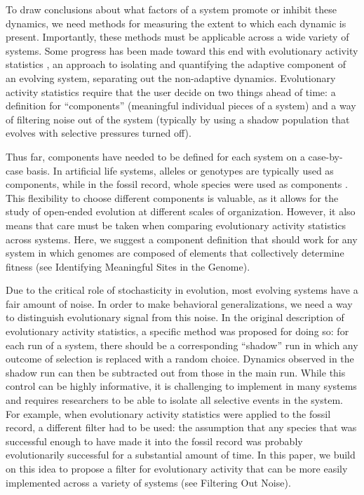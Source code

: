 \documentclass[letterpaper]{article}
\begin{document}
To draw conclusions about what factors of a system promote or inhibit these dynamics, we need methods for measuring the extent to which each dynamic is present. Importantly, these methods must be applicable across a wide variety of systems. Some progress has been made toward this end with evolutionary activity statistics \citep{bedau_classification_1998, channon_passing_2001}, an approach to isolating and quantifying the adaptive component of an evolving system, separating out the non-adaptive dynamics. Evolutionary activity statistics require that the user decide on two things ahead of time: a definition for ``components'' (meaningful individual pieces of a system) and a way of filtering noise out of the system (typically by using a shadow population that evolves with selective pressures turned off). 

Thus far, components have needed to be defined for each system on a case-by-case basis.  In artificial life systems, alleles or genotypes are typically used as components, while in the fossil record, whole species were used as components \citep{bedau1998classification}.
This flexibility to choose different components is valuable, as it allows for the study of open-ended evolution at different scales of organization. However, it also means that care must be taken when comparing evolutionary activity statistics across systems. Here, we suggest a component definition that should work for any system in which genomes are composed of elements that collectively determine fitness (see Identifying Meaningful Sites in the Genome).

Due to the critical role of stochasticity in evolution, most evolving systems have a fair amount of noise. In order to make behavioral generalizations, we need a way to distinguish evolutionary signal from this noise. In the original description of evolutionary activity statistics, a specific method was proposed for doing so: for each run of a system, there should be a corresponding ``shadow'' run in which any outcome of selection is replaced with a random choice. Dynamics observed in the shadow run can then be subtracted out from those in the main run. While this control can be highly informative, it is challenging to implement in many systems and requires researchers to be able to isolate all selective events in the system. For example, when evolutionary activity statistics were applied to the fossil record, a different filter had to be used: the assumption that any species that was successful enough to have made it into the fossil record was probably evolutionarily successful for a substantial amount of time. In this paper, we build on this idea to propose a filter for evolutionary activity that can be more easily implemented across a variety of systems (see Filtering Out Noise).
\end{document}

